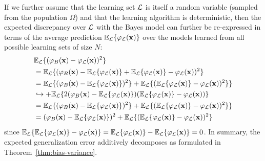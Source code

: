 If we further assume that the learning set ${\cal L}$ is itself a random
variable (sampled from the population $\Omega$) and that the learning algorithm is deterministic, then the expected
discrepancy over ${\cal L}$ with the Bayes model can further be re-expressed in terms of the
average prediction $\mathbb{E}_{\cal L} \{ \varphi_{\cal L}(\mathbf{x}) \}$
over the models learned from all possible learning sets of size $N$:
\begin{align}
& \mathbb{E}_{\cal L} \{ (\varphi_B(\mathbf{x}) - \varphi_{\cal L}(\mathbf{x}))^2 \}\nonumber \\
&= \mathbb{E}_{\cal L} \{ (\varphi_B(\mathbf{x}) - \mathbb{E}_{\cal L} \{ \varphi_{\cal L}(\mathbf{x}) \} + \mathbb{E}_{\cal L} \{ \varphi_{\cal L}(\mathbf{x}) \} - \varphi_{\cal L}(\mathbf{x}))^2 \} \nonumber \\
&= \mathbb{E}_{\cal L} \{ (\varphi_B(\mathbf{x}) - \mathbb{E}_{\cal L} \{ \varphi_{\cal L}(\mathbf{x}) \} )^2 \} + \mathbb{E}_{\cal L} \{ (\mathbb{E}_{\cal L} \{ \varphi_{\cal L}(\mathbf{x}) \} - \varphi_{\cal L}(\mathbf{x}))^2 \} \}\nonumber \\
& \hookrightarrow+ \mathbb{E}_{\cal L} \{ 2(\varphi_B(\mathbf{x}) - \mathbb{E}_{\cal L} \{ \varphi_{\cal L}(\mathbf{x}) \})(\mathbb{E}_{\cal L} \{ \varphi_{\cal L}(\mathbf{x}) \} - \varphi_{\cal L}(\mathbf{x}))\} \nonumber \\
&= \mathbb{E}_{\cal L} \{ (\varphi_B(\mathbf{x}) - \mathbb{E}_{\cal L} \{ \varphi_{\cal L}(\mathbf{x}) \} )^2 \} + \mathbb{E}_{\cal L} \{ (\mathbb{E}_{\cal L} \{ \varphi_{\cal L}(\mathbf{x}) \} - \varphi_{\cal L}(\mathbf{x}))^2 \} \}\nonumber \\
&= (\varphi_B(\mathbf{x}) - \mathbb{E}_{\cal L} \{ \varphi_{\cal L}(\mathbf{x}) \} )^2 + \mathbb{E}_{\cal L} \{ (\mathbb{E}_{\cal L} \{ \varphi_{\cal L}(\mathbf{x}) \} - \varphi_{\cal L}(\mathbf{x}))^2 \}
\end{align}
since $\mathbb{E}_{\cal L}\{ \mathbb{E}_{\cal L} \{ \varphi_{\cal
L}(\mathbf{x}) \} - \varphi_{\cal L}(\mathbf{x}) \} =  \mathbb{E}_{\cal L} \{
\varphi_{\cal L}(\mathbf{x}) \} -  \mathbb{E}_{\cal L} \{ \varphi_{\cal
L}(\mathbf{x}) \} = 0$. In summary, the expected generalization error additively
decomposes as formulated in Theorem~\ref{thm:bias-variance}.

